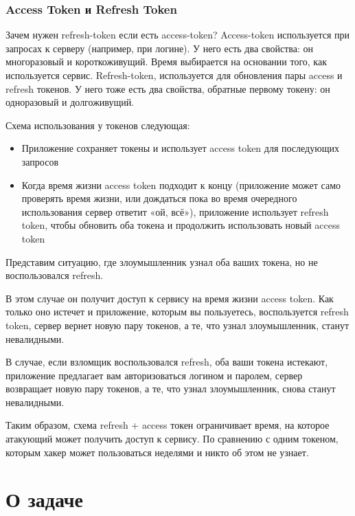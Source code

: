 \documentclass[12pt, a4paper]{diplom}
\begin{document}
\subsection{Access Token и Refresh Token}

Зачем нужен refresh-token если есть access-token?  
Access-token используется при запросах к серверу (например, при логине). У него есть два свойства: он многоразовый и короткоживущий. Время выбирается на основании того, как используется сервис. 
Refresh-token, используется для обновления пары access и refresh токенов. У него тоже есть два свойства, обратные первому токену: он одноразовый и долгоживущий.

Схема использования у токенов следующая:

\begin{itemize}
   логинится в приложении, передавая логин и пароль на сервер. Они не сохраняются на устройстве, а сервер возвращает два токена и время их жизни
  \item Приложение сохраняет токены и использует access token для последующих запросов
  \item Когда время жизни access token подходит к концу (приложение может само проверять время жизни, или дождаться пока во время очередного использования сервер ответит «ой, всё»), приложение использует refresh token, чтобы обновить оба токена и продолжить использовать новый access token
\end{itemize}

Представим ситуацию, где злоумышленник узнал оба ваших токена, но не воспользовался refresh.

В этом случае он получит доступ к сервису на время жизни access token. Как только оно истечет и приложение, которым вы пользуетесь, воспользуется refresh token, сервер вернет новую пару токенов, а те, что узнал злоумышленник, станут невалидными.

В случае, если взломщик воспользовался refresh, оба ваши токена истекают, приложение предлагает вам авторизоваться логином и паролем, сервер возвращает новую пару токенов, а те, что узнал злоумышленник, снова станут невалидными.

Таким образом, схема refresh + access токен ограничивает время, на которое атакующий может получить доступ к сервису. По сравнению с одним токеном, которым хакер может пользоваться неделями и никто об этом не узнает.
\chapter{О задаче}
\end{document}
